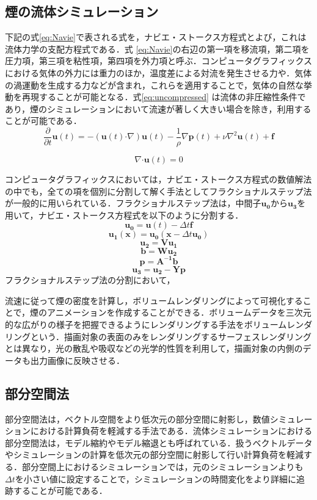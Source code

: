 \documentclass[uplatex,dvipdfmx,10pt,a4paper,notitlepage,oneside,twocolumn]{abst_jsarticle}
\begin{document}
\subsection{煙の流体シミュレーション}
下記の式\ref{eq:Navie}で表される式を，ナビエ・ストークス方程式とよび，これは流体力学の支配方程式である．式 \ref{eq:Navie}の右辺の第一項を移流項，第二項を圧力項，第三項を粘性項，第四項を外力項と呼ぶ．コンピュータグラフィックスにおける気体の外力には重力のほか，温度差による対流を発生させる力や．気体の渦運動を生成する力などが含まれ，これらを適用することで，気体の自然な挙動を再現することが可能となる．式\ref{eq:uncompressed} は流体の非圧縮性条件であり，煙のシミュレーションにおいて流速が著しく大きい場合を除き，利用することが可能である．
	\begin{equation}\label{eq:Navie}
		\frac{\partial}{\partial t}\bm{u} (t)  = - (\bm{u} (t)  \boldsymbol{\cdot}\nabla) \bm{u} (t)   - \frac{1}{\rho}\nabla \bm{p} (t)  + \nu\nabla^2\bm{u} (t)  + \bm{f}
	\end{equation}
	
	\begin{equation}\label{eq:uncompressed}
		\nabla\boldsymbol{\cdot}\bm{u} (t)  = 0
	\end{equation}
	
コンピュータグラフィックスにおいては，ナビエ・ストークス方程式の数値解法の中でも，全ての項を個別に分割して解く手法としてフラクショナルステップ法 \cite{Chorin}が一般的に用いられている．フラクショナルステップ法は，中間子$\bm{u_0}$から$\bm{u_3}$を用いて，ナビエ・ストークス方程式を以下のように分割する．
\[
	\bm{u_0} =  \bm{u} (t)  - \varDelta t \bm{f} 	
\]
\[
	\bm{u_1}(\bm{x}) = \bm{u_0}(\bm{x}  - \varDelta t \bm{u_0})
\]
\[
	\bm{u_2}   =  \bm{V}\bm{u_1}
\]
\[
	\bm{b} = \bm{W}\bm{u_2}
\]
\[
	\bm{p} = \bm{A^{-1}}\bm{b}
\]
\[
	\bm{u_3}  =  \bm{u_2} - \bm{Y}\bm{p} 
\]
フラクショナルステップ法の分割において，

流速に従って煙の密度を計算し，ボリュームレンダリングによって可視化することで，煙のアニメーションを作成することができる．ボリュームデータを三次元的な広がりの様子を把握できるようにレンダリングする手法をボリュームレンダリングという．描画対象の表面のみをレンダリングするサーフェスレンダリングとは異なり，光の散乱や吸収などの光学的性質を利用して，描画対象の内側のデータも出力画像に反映させる．
\subsection{部分空間法}
部分空間法は，ベクトル空間をより低次元の部分空間に射影し，数値シミュレーションにおける計算負荷を軽減する手法である．流体シミュレーションにおける部分空間法は，モデル縮約やモデル縮退とも呼ばれている．扱うベクトルデータやシミュレーションの計算を低次元の部分空間に射影して行い計算負荷を軽減する．部分空間上におけるシミュレーションでは，元のシミュレーションよりも$\varDelta t$を小さい値に設定することで，シミュレーションの時間変化をより詳細に追跡することが可能である．
\end{document}
